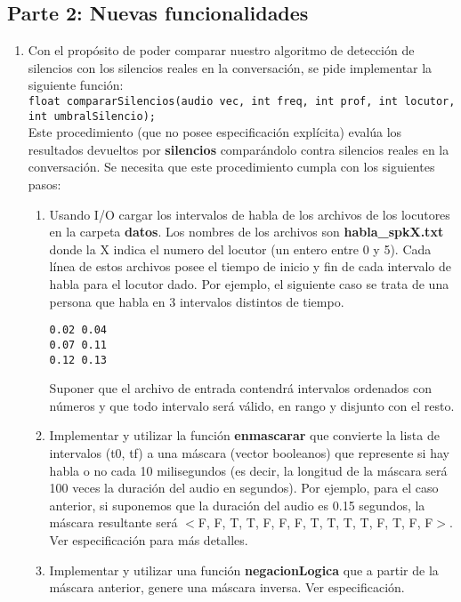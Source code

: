 \documentclass[a4paper]{article}
\newcounter{saveenumi}
\newcommand{\conti}{\setcounter{enumi}{\value{saveenumi}}}
\begin{document}
\subsection{Parte 2: Nuevas funcionalidades}



\begin{enumerate}
\conti
\item Con el propósito de poder comparar nuestro algoritmo de detección de silencios con los silencios reales en la conversación, se pide implementar la siguiente función:\\
\lstinline{float compararSilencios(audio vec, int freq, int prof, int locutor, int umbralSilencio);} \\
Este procedimiento (que no posee especificación explícita) evalúa los resultados devueltos por \textbf{silencios} comparándolo contra silencios reales en la conversación. Se necesita que este procedimiento cumpla con los siguientes pasos:
\begin{enumerate}
\item Usando I/O cargar los intervalos de habla de los archivos de los locutores en la carpeta \textbf{datos}.
Los nombres de los archivos son \textbf{habla\_spkX.txt} donde la X indica el numero del locutor (un entero entre 0 y 5).
Cada línea de estos archivos posee el tiempo de inicio y fin de cada intervalo de habla para el locutor dado. Por ejemplo, el siguiente caso se trata de una persona que habla en 3 intervalos distintos de tiempo.
\begin{lstlisting}
0.02 0.04
0.07 0.11
0.12 0.13
\end{lstlisting}
Suponer que el archivo de entrada contendrá intervalos ordenados con números y que todo intervalo será válido, en rango y disjunto con el resto.

\item Implementar y utilizar la función \textbf{enmascarar} que convierte la lista de intervalos (t0, tf) a una máscara (vector booleanos) que represente si hay habla o no cada 10 milisegundos (es decir, la longitud de la máscara será 100 veces la duración del audio en segundos). Por ejemplo, para el caso anterior, si suponemos que la duración del audio es 0.15 segundos, la máscara resultante será $<$F, F, T, T, F, F, F, T, T, T, T, F, T, F, F$>$. Ver especificación para más detalles.

\item Implementar y utilizar una función \textbf{negacionLogica} que a partir de la máscara anterior, genere una máscara inversa. Ver especificación.


\end{enumerate}
\end{enumerate}
\end{document}
